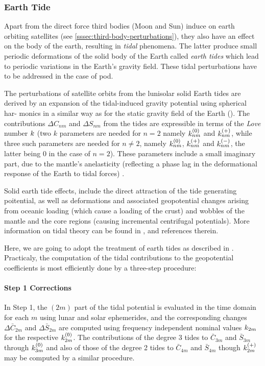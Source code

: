 \subsubsection{Earth Tide}\label{sssec:earth-tide-perturbations}

Apart from the direct force third bodies (Moon and Sun) induce on earth orbiting 
satellites (see \ref{sssec:third-body-perturbations}), they also have an effect on 
the body of the earth, resulting in \emph{tidal} phenomena. The latter produce 
small periodic deformations of the solid body of the Earth called \emph{earth tides} 
which lead to periodic variations in the Earth's gravity field. These tidal perturbations 
have to be addressed in the case of \gls{pod}.

The perturbations of satellite orbits from the lunisolar solid Earth tides are
derived by an expansion of the tidal-induced gravity potential using spherical har-
monics in a similar way as for the static gravity field of the Earth (\cite{Montenbruck2000}).
The contributions $\Delta C_{nm}$ and $\Delta S_{nm}$ from the tides are expressible 
in terms of the \emph{Love} number $k$ (two $k$ parameters are needed for 
$n=2$ namely $k ^{(0)}_{nm}$ and $k ^{(+)}_{nm}$, while three such parameters 
are needed for $n \ne 2$, namely $k ^{(0)}_{nm}$, $k ^{(+)}_{nm}$ and 
$k ^{(-)}_{nm}$, the latter being $0$ in the case of $n=2$). These parameters include 
a small imaginary part, due to the mantle's anelasticity (reflecting a
phase lag in the deformational response of the Earth to tidal forces) \cite{iers2010}.

Solid earth tide effects, include the direct attraction of the tide generating poitential, 
as well as deformations and associated geopotential changes arising from oceanic loading 
(which cause a loading of the crust) and wobbles of the mantle and the core regions 
(causing incremental centrifugal potentials). More information on tidal theory can 
be found in \cite{Wilhelm1997}, \cite{iers2010} and references therein. 

Here, we are going to adopt the treatment of earth tides as described in 
\cite{iers2010}. Practicaly, the computation of the tidal contributions to the 
geopotential coefficients is most efficiently done by a three-step procedure:
 
\paragraph{Step 1 Corrections}\label{par:step1-corr-earth-tides}
In Step 1, the $(2m)$ part of the tidal potential is evaluated in the 
time domain for each $m$ using lunar and solar ephemerides, and the 
corresponding changes $\Delta \bar{C}_{2m}$ and $\Delta \bar{S}_{2m}$ are 
computed using frequency independent nominal values $k _{2m}$ for the 
respective $k ^{(0)}_{2m}$. The contributions of the degree 3 tides to
$\bar{C}_{3m}$ and $\bar{S}_{3m}$ through $k ^{(0)}_{3m}$ and also of 
those of the degree 2 tides to $\bar{C}_{4m}$ and $\bar{S}_{4m}$ though 
$k ^{(+)}_{2m}$ may be computed by a similar procedure.

